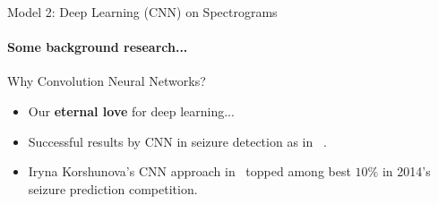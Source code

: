 \documentclass{beamer}
\begin{document}
\begin{frame}{Model 2: Deep Learning (CNN) on Spectrograms}
  \framesubtitle{Some background research...}

  \begin{block}{Why Convolution Neural Networks?}
    \begin{itemize}
    \item Our \textbf{eternal love} for deep learning...
    \item Successful results by CNN in seizure detection as in
      ~\cite{korshunova_faculty_2015,mirowski2008comparing}.
    \item Iryna Korshunova's CNN approach in~\cite{korshunova_faculty_2015}
      topped among best $10\%$ in 2014's seizure prediction competition.
    \end{itemize}
  \end{block}

\end{frame}


  




\end{document}
